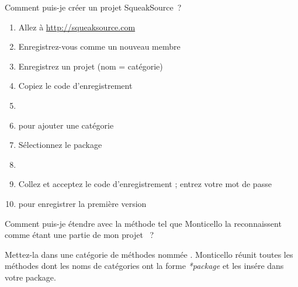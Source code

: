 \documentclass[a4paper,10pt,twoside]{book}
\begin{document}
\begin{faq}
Comment puis-je créer un projet SqueakSource~?
\end{faq}
\answer
\begin{enumerate}
  \item Allez à \url{http://squeaksource.com}
  \item Enregistrez-vous comme un nouveau membre
  \item Enregistrez un projet (nom = catégorie)
  \item Copiez le code d'enregistrement
  \item {}
  \item {} pour ajouter une catégorie
  \item Sélectionnez le package
  \item {}
  \item Collez et acceptez le code d'enregistrement ; entrez votre mot de passe
  \item {} pour enregistrer la première version
\end{enumerate}

\begin{faq}
Comment puis-je étendre  avec
la méthode  
tel que Monticello la reconnaissent comme étant une partie de mon projet ~?
\end{faq}
\answer
Mettez-la 
dans une catégorie de méthodes nommée .
Monticello réunit toutes les méthodes 
dont les noms de catégories 
ont la forme \emph{*package} et les insére dans votre package.
\end{document}
